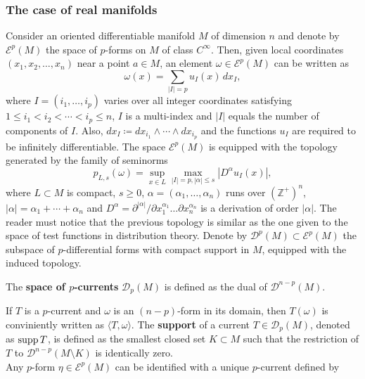 \subsubsection{The case of real manifolds}
Consider an oriented differentiable manifold $M$ of dimension $n$ and denote by $\mathcal{E}^p(M)$ the space of $p$-forms on $M$ of class $C^\infty$. Then, given local coordinates $(x_1,x_2,\dots,x_n)$ near a point $a\in M$, an element $\omega\in\mathcal{E}^p(M)$ can be written as
$$\omega(x) = \sum_{|I|=p} u_I(x)\,dx_I,$$
where $I=(i_1,\dots,i_p)$ varies over all integer coordinates satisfying $1\leq i_1 < i_2 < \cdots < i_p \leq n$, $I$ is a multi-index and $|I|$ equals the number of components of $I$. Also, $dx_I \coloneqq dx_{i_1} \wedge \cdots \wedge dx_{i_p}$ and the functions $u_I$ are required to be infinitely differentiable. The space $\mathcal{E}^p(M)$ is equipped with the topology generated by the family of seminorms
\begin{equation}\label{seminorms}
p_{L,s}(\omega) = \sup_{x\in L} \max_{|I|=p,|\alpha| \leq s} |D^\alpha u_I(x)|,
\end{equation}
where $L\subset M$ is compact, $s\geq 0$, $\alpha = (\alpha_1,\dots,\alpha_n)$ runs over $(\mathbb{Z}^+)^n$, $|\alpha|=\alpha_1+\cdots +\alpha_n$ and $D^{\alpha} = \partial^{|\alpha|}/\partial x_1^{\alpha_1}\dots \partial x_n^{\alpha_n}$ is a derivation of order $|\alpha|$. The reader must notice that the previous topology is similar as the one given to the space of test functions in distribution theory. Denote by $\mathcal{D}^p(M) \subset \mathcal{E}^p(M)$ the subspace of $p$-differential forms with compact support in $M$, equipped with the induced topology.

\begin{mydef}{}{}
The {\bf space of $p$-currents} $\mathcal{D}_p(M)$ is defined as the dual of $\mathcal{D}^{n-p}(M)$.
\end{mydef} 
If $T$ is a $p$-current and $\omega$ is an $(n-p)$-form in its domain, then $T(\omega)$ is conviniently written as $\langle T, \omega\rangle$. The {\bf support} of a current $T\in \mathcal{D}_p(M)$, denoted as $\text{supp}\,T$, is defined as the smallest closed set $K\subset M$ such that the restriction of $T$ to $\mathcal{D}^{n-p}(M\setminus K)$ is identically zero.\\

Any $p$-form $\eta \in \mathcal{E}^p(M)$ can be identified with a unique $p$-current defined by 


